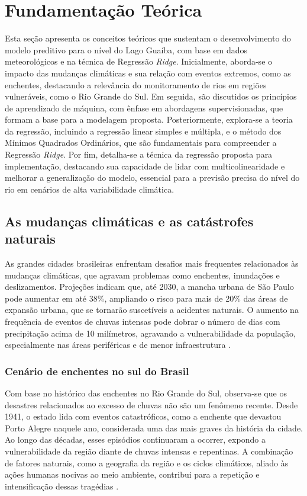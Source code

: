 \chapter{Fundamentação Teórica}\label{cap:fundamentacaoTeorica}
Esta seção apresenta os conceitos teóricos que sustentam o desenvolvimento do modelo preditivo para o nível do Lago Guaíba, com base em dados meteorológicos e na técnica de Regressão \textit{Ridge}. Inicialmente, aborda-se o impacto das mudanças climáticas e sua relação com eventos extremos, como as enchentes, destacando a relevância do monitoramento de rios em regiões vulneráveis, como o Rio Grande do Sul. Em seguida, são discutidos os princípios de aprendizado de máquina, com ênfase em abordagens supervisionadas, que formam a base para a modelagem proposta. Posteriormente, explora-se a teoria da regressão, incluindo a regressão linear simples e múltipla, e o método dos Mínimos Quadrados Ordinários, que são fundamentais para compreender a Regressão \textit{Ridge}. Por fim, detalha-se a técnica da regressão proposta para implementação, destacando sua capacidade de lidar com multicolinearidade e melhorar a generalização do modelo, essencial para a previsão precisa do nível do rio em cenários de alta variabilidade climática.

\section{As mudanças climáticas e as catástrofes naturais}

As grandes cidades brasileiras enfrentam desafios mais frequentes relacionados às mudanças climáticas, que agravam problemas como enchentes, inundações e deslizamentos. Projeções indicam que, até 2030, a mancha urbana de São Paulo pode aumentar em até 38\%, ampliando o risco para mais de 20\% das áreas de expansão urbana, que se tornarão suscetíveis a acidentes naturais. O aumento na frequência de eventos de chuvas intensas pode dobrar o número de dias com precipitação acima de 10 milímetros, agravando a vulnerabilidade da população, especialmente nas áreas periféricas e de menor infraestrutura \cite{Nobre2011}.

\subsection{Cenário de enchentes no sul do Brasil}

Com base no histórico das enchentes no Rio Grande do Sul, observa-se que os desastres relacionados ao excesso de chuvas não são um fenômeno recente. Desde 1941, o estado lida com eventos catastróficos, como a enchente que devastou Porto Alegre naquele ano, considerada uma das mais graves da história da cidade. Ao longo das décadas, esses episódios continuaram a ocorrer, expondo a vulnerabilidade da região diante de chuvas intensas e repentinas. A combinação de fatores naturais, como a geografia da região e os ciclos climáticos, aliado às ações humanas nocivas ao meio ambiente, contribui para a repetição e intensificação dessas tragédias \cite{veja2024}.

